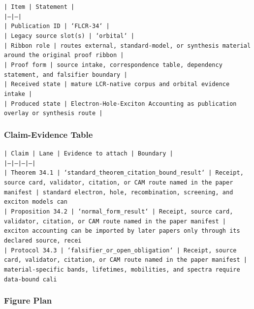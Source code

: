 \documentclass[11pt]{article}
\begin{document}
\noindent\texttt{| Item | Statement |}\\
\noindent\texttt{|---|---|}\\
\noindent\texttt{| Publication ID | `FLCR-34` |}\\
\noindent\texttt{| Legacy source slot(s) | `orbital` |}\\
\noindent\texttt{| Ribbon role | routes external, standard-model, or synthesis material around the original proof ribbon |}\\
\noindent\texttt{| Proof form | source intake, correspondence table, dependency statement, and falsifier boundary |}\\
\noindent\texttt{| Received state | mature LCR-native corpus and orbital evidence intake |}\\
\noindent\texttt{| Produced state | Electron-Hole-Exciton Accounting as publication overlay or synthesis route |}\\

\subsubsection*{Claim-Evidence Table}

\noindent\texttt{| Claim | Lane | Evidence to attach | Boundary |}\\
\noindent\texttt{|---|---|---|---|}\\
\noindent\texttt{| Theorem 34.1 | `standard\_theorem\_citation\_bound\_result` | Receipt, source card, validator, citation, or CAM route named in the paper manifest | standard electron, hole, recombination, screening, and exciton models can }\\
\noindent\texttt{| Proposition 34.2 | `normal\_form\_result` | Receipt, source card, validator, citation, or CAM route named in the paper manifest | exciton accounting can be imported by later papers only through its declared source, recei}\\
\noindent\texttt{| Protocol 34.3 | `falsifier\_or\_open\_obligation` | Receipt, source card, validator, citation, or CAM route named in the paper manifest | material-specific bands, lifetimes, mobilities, and spectra require data-bound cali}\\

\subsubsection*{Figure Plan}
\end{document}
